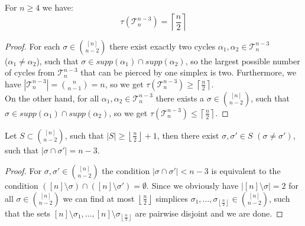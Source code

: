 \begin{lem}\label{lemma12}
For \(n\geq 4\) we have:
\[
\tau(\mathcal{T}_n^{n-3})=\left\lceil\frac{n}{2}\right\rceil
\]
\begin{proof}
For each \(\sigma\in\binom{[n]}{n-2}\) there exist exactly two cycles \(\alpha_1,\alpha_2\in\mathcal{T}_n^{n-3}\)\\
(\(\alpha_1\neq\alpha_2\)), such that \(\sigma\in supp(\alpha_1)\cap supp(\alpha_2)\), so the largest possible number of cycles from \(\mathcal{T}_n^{n-3}\) that can be pierced by one simplex is two. Furthermore, we have \(\left|\mathcal{T}_n^{n-3}\right|=\binom{n}{n-1}=n\), so we get \(\tau(\mathcal{T}_n^{n-3})\geq\left\lceil\frac{n}{2}\right\rceil\).\\
On the other hand, for all \(\alpha_1,\alpha_2\in\mathcal{T}_n^{n-3}\) there exists a \(\sigma\in\binom{[n]}{n-2}\), such that \(\sigma\in supp(\alpha_1)\cap supp(\alpha_2)\), so we get \(\tau(\mathcal{T}_n^{n-3})\leq\left\lceil\frac{n}{2}\right\rceil\).
\end{proof}
\end{lem}

\begin{lem}\label{lemma13}
Let \(S\subset\binom{[n]}{n-2}\), such that \(\left|S\right|\geq\left\lfloor\frac{n}{2}\right\rfloor+1\), then there exist \(\sigma,\sigma'\in S\) \((\sigma\neq\sigma')\), such that \(\left|\sigma\cap\sigma'\right|=n-3\).
\begin{proof}
For \(\sigma,\sigma'\in\binom{[n]}{n-2}\) the condition \(\left|\sigma\cap\sigma'\right|<n-3\) is equivalent to the condition \(([n]\setminus\sigma)\cap([n]\setminus\sigma')=\emptyset\). Since we obviously have \(\left|[n]\setminus\sigma\right|=2\) for all \(\sigma\in\binom{[n]}{n-2}\) we can find at most \(\left\lfloor\frac{n}{2}\right\rfloor\) simplices \(\sigma_1,\ldots,\sigma_{\left\lfloor\frac{n}{2}\right\rfloor}\in\binom{[n]}{n-2}\), such that the sets \([n]\setminus\sigma_1,\ldots,[n]\setminus\sigma_{\left\lfloor\frac{n}{2}\right\rfloor}\) are pairwise disjoint and we are done.
\end{proof}
\end{lem}


